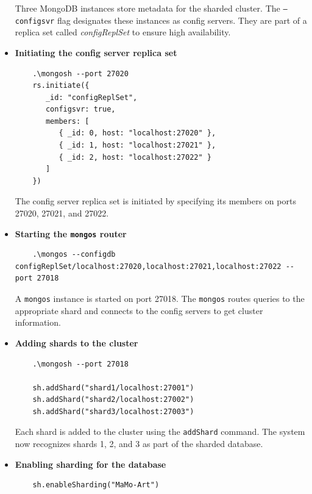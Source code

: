 \documentclass[a4paper,12pt]{article}
\begin{document}
\begin{itemize}
    Three MongoDB instances store metadata for the sharded cluster. The \texttt{--configsvr} flag designates these instances as config servers. They are part of a replica set called \textit{configReplSet} to ensure high availability.

    \item \textbf{Initiating the config server replica set}

    \begin{lstlisting}
    .\mongosh --port 27020
    rs.initiate({
       _id: "configReplSet",
       configsvr: true,
       members: [
          { _id: 0, host: "localhost:27020" },
          { _id: 1, host: "localhost:27021" },
          { _id: 2, host: "localhost:27022" }
       ]
    })
    \end{lstlisting}

    The config server replica set is initiated by specifying its members on ports 27020, 27021, and 27022.

    \item \textbf{Starting the \texttt{mongos} router}

    \begin{lstlisting}
    .\mongos --configdb configReplSet/localhost:27020,localhost:27021,localhost:27022 --port 27018
    \end{lstlisting}

    A \texttt{mongos} instance is started on port 27018. The \texttt{mongos} routes queries to the appropriate shard and connects to the config servers to get cluster information.

    \item \textbf{Adding shards to the cluster}

    \begin{lstlisting}
    .\mongosh --port 27018

    sh.addShard("shard1/localhost:27001")
    sh.addShard("shard2/localhost:27002")
    sh.addShard("shard3/localhost:27003")
    \end{lstlisting}

    Each shard is added to the cluster using the \texttt{addShard} command. The system now recognizes shards 1, 2, and 3 as part of the sharded database.

    \item \textbf{Enabling sharding for the database}

    \begin{lstlisting}
    sh.enableSharding("MaMo-Art")
    \end{lstlisting}


\end{itemize}
\end{document}
